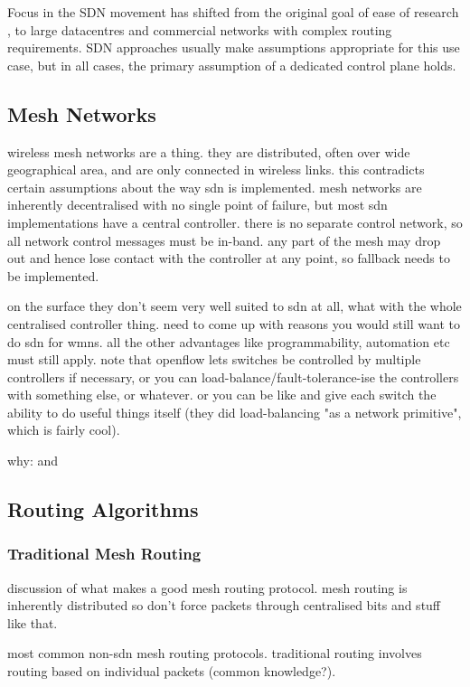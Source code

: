 \documentclass[pdftex,12pt,a4paper]{article}
\begin{document}
Focus in the SDN movement has shifted from the original goal of ease of research \cite{mckeown:openflow}, to large datacentres and commercial networks with complex routing requirements. SDN approaches usually make assumptions appropriate for this use case, but in all cases, the primary assumption of a dedicated control plane holds.

\newpage
\subsection{Mesh Networks}
wireless mesh networks are a thing. they are distributed, often over wide geographical area, and are only connected in wireless links. this contradicts certain assumptions about the way sdn is implemented. mesh networks are inherently decentralised with no single point of failure, but most sdn implementations have a central controller. there is no separate control network, so all network control messages must be in-band. any part of the mesh may drop out and hence lose contact with the controller at any point, so fallback needs to be implemented.

on the surface they don't seem very well suited to sdn at all, what with the whole centralised controller thing. need to come up with reasons you would still want to do sdn for wmns. all the other advantages like programmability, automation etc must still apply. note that openflow lets switches be controlled by multiple controllers if necessary, or you can load-balance/fault-tolerance-ise the controllers with something else, or whatever. or you can be like \cite{handigol:asterix} and give each switch the ability to do useful things itself (they did load-balancing "as a network primitive", which is fairly cool).

why: \cite{mendonca:hetero} and \cite{dely:wmn}

\newpage
\subsection{Routing Algorithms}
\subsubsection{Traditional Mesh Routing}
discussion of what makes a good mesh routing protocol. mesh routing is inherently distributed so don't force packets through centralised bits and stuff like that.

most common non-sdn mesh routing protocols. traditional routing involves routing based on individual packets (common knowledge?).
\end{document}
